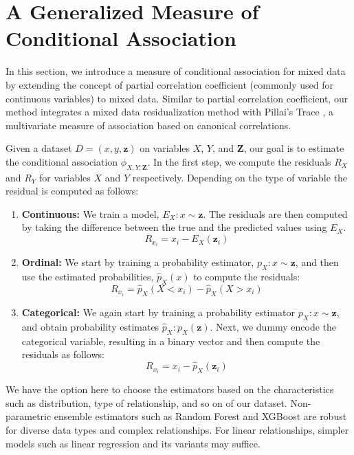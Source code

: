 \section{A Generalized Measure of Conditional Association}
\label{sec:mixed_association}

In this section, we introduce a measure of conditional
association for mixed data by extending the concept of partial correlation
coefficient (commonly used for continuous variables) to mixed data. Similar to
partial correlation coefficient, our method integrates a mixed data
residualization method \citep{Ankan2023} with Pillai's Trace
\citep{Pillai1955}, a multivariate measure of association based on canonical
correlations.
 
Given a dataset $ D = (x, y, \bm{z}) $ on variables $ X $, $ Y $, and $ \bm{Z}
$, our goal is to estimate the conditional association $ \phi_{X, Y; \bm{Z}} $. 
In the first step, we compute the residuals $ R_X $ and $ R_Y $ for variables
$ X $ and $ Y $ respectively. Depending on the type of variable the residual
is computed as follows:

\begin{enumerate}
	\item \textbf{Continuous:} We train a model, $ E_X: x \sim
		\bm{z} $. The residuals are then computed by taking the difference
		between the true and the predicted values using $ E_X $. 
		$$ R_{x_i} = x_i - E_X(\bm{z}_i) $$
	\item \textbf{Ordinal:} We start by training a probability estimator, $
		p_X: x \sim \bm{z} $, and then use the estimated probabilities, 
		$ \hat{p}_X(x) $ to compute the residuals:
		$$ R_{x_i} = \hat{p}_X(X < x_i) - \hat{p}_X(X > x_i) $$
	\item \textbf{Categorical:} We again start by training a probability
		estimator $ p_X: x \sim \bm{z} $, and obtain probability
		estimates $ \hat{p}_X: p_X(\bm{z}) $. Next, we dummy encode the
		categorical variable, resulting in a binary vector and then
		compute the residuals as follows: 
		$$ R_{x_i} = x_i - \hat{p}_X(\bm{z}_i) $$
\end{enumerate}

We have the option here to choose the estimators based on the characteristics
such as distribution, type of relationship, and so on of our dataset.
Non-parametric ensemble estimators such as Random Forest and XGBoost are robust 
for diverse data types and complex relationships. For linear relationships,
simpler models such as linear regression and its variants may suffice.

